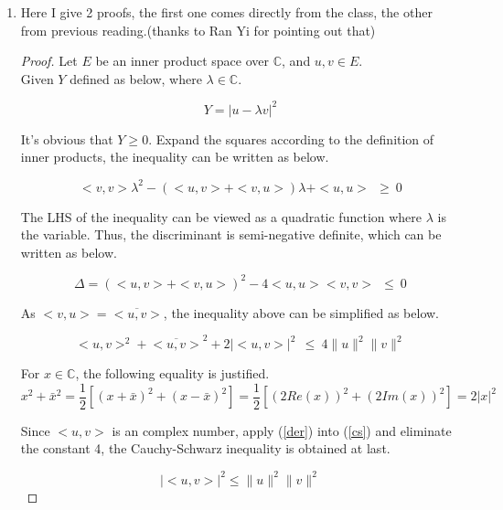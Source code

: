 \documentclass[paper=a4, fontsize=11pt]{scrartcl} %
\numberwithin{equation}{section} %
\numberwithin{figure}{section} %
\numberwithin{table}{section} %
\begin{document}
\begin{enumerate}
	\item
		Here I give 2 proofs, the first one comes directly from the class, the other from previous reading.(thanks to Ran Yi for pointing out that)
		
		\begin{proof}
			Let $E$ be an inner product space over $\mathbb{C}$, and $u, v\in E$.\\
			Given $Y$ defined as below, where $\lambda \in \mathbb{C}$.
						
			\begin{equation}
				Y = {\vert u-\lambda v \vert}^2
			\end{equation}
			
			It's obvious that $Y\geq0$. Expand the squares according to the definition of inner products, the inequality can be written as below.
			
			\begin{equation}
				<v, v>\lambda^2 -(<u, v>+<v, u>)\lambda + <u, u> \ \ \geq \ 0
			\end{equation}
			
			The LHS of the inequality can be viewed as a quadratic function where $\lambda$ is the variable. Thus, the discriminant is semi-negative definite, which can be written as below.
			
			\begin{equation}
				\Delta = (<u, v>+<v, u>)^2 - 4<u,u><v,v> \ \ \leq \ 0
			\end{equation}
			
			As $<v, u> = \overline{<u, v>}$, the inequality above can be simplified as below.
			
			\begin{equation}
				<u, v>^2 + {\overline{<u, v>}}^2 + 2{\vert <u,v> \vert}^2 \ \ \leq \ 4 \lVert u \rVert^2 \lVert v \rVert^2 \label{cs}			
			\end{equation}
			
			For $x \in \mathbb{C}$, the following equality is justified.
			\begin{equation}
				x^2 + \bar{x}^2 = \frac{1}{2}[(x+\bar{x})^2+(x-\bar{x})^2] = \frac{1}{2}[(2Re(x))^2+(2Im(x))^2] = 2 {\vert x \vert}^2 \label{der}
			\end{equation}
			
			Since $<u, v>$ is an complex number, apply (\ref{der}) into (\ref{cs}) and eliminate the constant 4, the Cauchy-Schwarz inequality is obtained at last.
			
			\begin{equation}
				{\vert <u,v> \vert}^2 \leq \lVert u \rVert^2 \lVert v \rVert^2
			\end{equation}
		\end{proof}
	

\end{enumerate}
\end{document}
